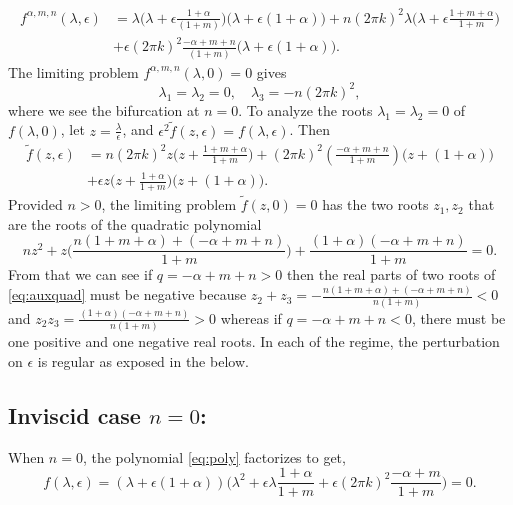 \documentclass[a4paper,11pt]{article}
\theoremstyle{remark}
\begin{document}
\begin{align}
f^{\alpha,m,n}(\lambda,\epsilon)&= \lambda\Big(\lambda + \epsilon\frac{1+\alpha}{(1+m)}\Big)\Big(\lambda + \epsilon(1+\alpha)\Big) + n(2\pi k)^2\lambda\Big(\lambda + \epsilon\frac{1+m+\alpha}{1+m}\Big) \nonumber \\
&+ \epsilon(2\pi k)^2\frac{-\alpha+m+n}{(1+m)}\Big(\lambda + \epsilon(1+\alpha)\Big).
\end{align}
The limiting problem $f^{\alpha,m,n}(\lambda,0)=0$ gives
$$ \lambda_1=\lambda_2=0, \quad \lambda_3 = -n(2\pi k)^2,$$
where we see the bifurcation at $n=0$. To analyze the roots $\lambda_1=\lambda_2=0$  of $f(\lambda,0)$, let $z = \frac{\lambda}{\epsilon}$, and $\epsilon^2\tilde{f}(z,\epsilon) =  f(\lambda, \epsilon)$. Then
\begin{align}
 \tilde{f}(z,\epsilon) &= n(2\pi k)^2 z\Big(z + \frac{1+m+\alpha}{1+m}\Big)+ (2\pi k)^2\left(\frac{-\alpha+m+n}{1+m}\right)\Big(z + (1+\alpha)\Big) \nonumber\\
 &+ \epsilon z\Big(z+\frac{1+\alpha}{1+m}\Big)\Big(z+(1+\alpha)\Big). \label{eq:reduced_poly}
\end{align}
Provided $n>0$, the limiting problem $\tilde{f}(z,0)=0$ has the two roots $z_1,z_2$ that are the roots of the quadratic polynomial
\begin{equation}
nz^2 + z\Big( \frac{n(1+m+\alpha) + (-\alpha+m+n)}{1+m}\Big) + \frac{(1+\alpha)(-\alpha+m+n)}{1+m} =0. \label{eq:auxquad}
\end{equation}
From that we can see if $q=-\alpha+m+n>0$ then the real parts of two roots of \eqref{eq:auxquad} must be negative because $z_2+z_3 = -\frac{n(1+m+\alpha) + (-\alpha+m+n)}{n(1+m)} < 0$ and $z_2z_3=\frac{(1+\alpha)(-\alpha+m+n)}{n(1+m)}>0$ whereas if $q=-\alpha+m+n<0$, there must be one positive and one negative real roots.
In each of the regime, the perturbation on $\epsilon$ is regular as exposed in the below.

\subsection{Inviscid case $n=0$:}
When $n=0$, the polynomial \eqref{eq:poly} factorizes to get,
$$ f(\lambda,\epsilon) = (\lambda +\epsilon(1+\alpha))\Big( \lambda^2 + \epsilon\lambda \frac{1+\alpha}{1+m} + \epsilon (2\pi k)^2 \frac{-\alpha+m}{1+m}\Big)=0.$$
\end{document}
